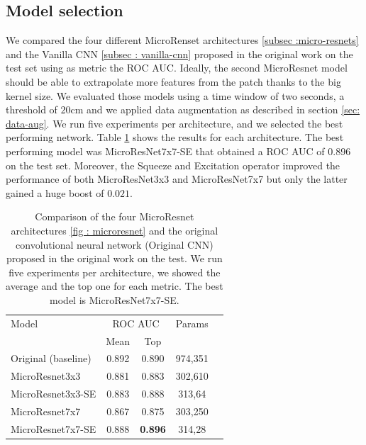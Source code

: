 \documentclass[../document.tex]{subfiles}
\begin{document}
\subsection{Model selection}
We compared the four different MicroRenset architectures \ref{subsec :micro-resnets} and the Vanilla CNN \ref{subsec : vanilla-cnn} proposed in the original work \cite{omar2018traversability} on the test set using as metric the ROC AUC.  Ideally, the second MicroResnet model should be able to extrapolate more features from the patch thanks to the big kernel size. We evaluated those models using a time window of two seconds, a threshold of $20$cm and we applied data augmentation as described in section \ref{sec: data-aug}. We run five experiments per architecture, and we selected the best performing network. Table \ref{tab : models-results-comparison} shows the results for each architecture. The best performing model was MicroResNet7x7-SE that obtained a ROC AUC of 0.896 on the test set. Moreover, the Squeeze and Excitation operator improved the performance of both MicroResNet3x3 and MicroResNet7x7 but only the latter gained a huge boost of $0.021$.
\begin{table}[ht]
  \centering
  \begin{tabular}{@{}lcccc@{}}
    \toprule
    Model & \multicolumn{2}{c}{ROC AUC} & Params \\ 
    \cline{1-4}
    & Mean & Top &  \\ 
    \cline{1-4}
    Original (baseline)  & 0.892& 0.890 &  974,351 \\
    MicroResnet3x3 & 0.881 & 0.883 & 302,610 \\
    MicroResnet3x3-SE & 0.883 & 0.888 & 313,64\\
    MicroResnet7x7 & 0.867 & 0.875 &  303,250\\
    MicroResnet7x7-SE &0.888 & \textbf{0.896} & 314,28\\
    \bottomrule   
  \end{tabular}
  \caption{Comparison of the four MicroResnet architectures \ref{fig : microresnet} and the original convolutional neural network (Original CNN) proposed in the original work \cite{omar2018traversability} on the test. We run five experiments per architecture, we showed the average and the top one for each metric. The best model is MicroResNet7x7-SE.}
  \label{tab : models-results-comparison}
\end{table}
\end{document}
